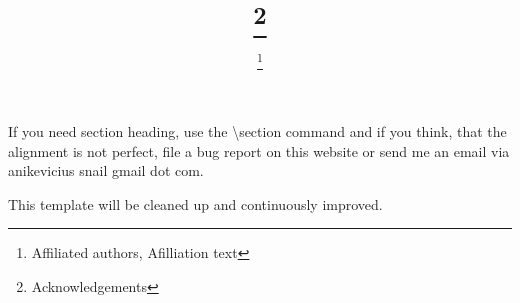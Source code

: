 \documentclass[ %
    twocolumn,  %
    10pt,       %
    angewchem,  %
    ]{wileyvch} %
\title{\@JTitle{}
\thanks{Acknowledgements
}}
\author{\@JAuthor{}
\thanks{ Affiliated authors,
\newline Afilliation text
}}
\date{}
\begin{document}

\maketitle

If you need section heading, use the \textbackslash{}section command and
if you think, that the alignment is not perfect, file a bug report on
this website or send me an email via anikevicius snail gmail dot com.

This template will be cleaned up and continuously improved.


\end{document}
